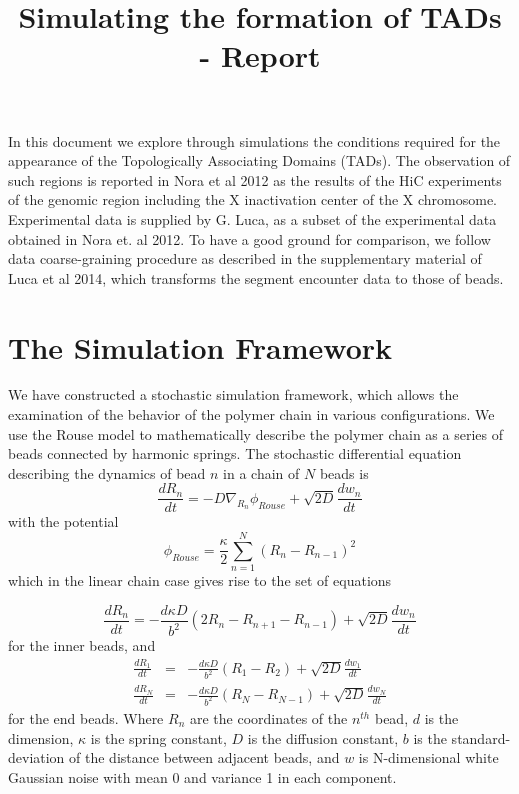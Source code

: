 \documentclass[12pt]{paper}
\begin{document}
\title{Simulating the formation of TADs - Report}
\maketitle
In this document we explore through simulations the conditions required for the appearance of the Topologically Associating Domains (TADs). The observation of such regions is reported in Nora et al 2012 as the results of the HiC experiments of the genomic region including the X inactivation center of the X chromosome. Experimental data is supplied by G. Luca, as a subset of the experimental data obtained in Nora et. al 2012. To have a good ground for comparison, we follow data coarse-graining procedure as described in the supplementary material of Luca et al 2014, which transforms the segment encounter data to those of beads.   

\section{The Simulation Framework}
We have constructed a stochastic simulation framework, which allows the examination of the behavior of the polymer chain in various configurations.
We use the Rouse model to mathematically describe the polymer chain as a series of beads connected by harmonic springs. The stochastic differential equation describing the dynamics of bead $n$ in a chain of $N$ beads is 
\begin{equation*}
\frac{dR_n}{dt} = -D\nabla_{R_n}\phi_{Rouse}+\sqrt{2D}\frac{dw_n}{dt}
\end{equation*}
with the potential 
\begin{equation*}
\phi_{Rouse}=\frac{\kappa}{2}\sum_{n=1}^N \left(R_n-R_{n-1}\right)^2
\end{equation*}
 which in the linear chain case gives rise to the set of equations

\begin{equation*}
\frac{dR_n}{dt}= -\frac{d\kappa D}{b^2}\left(2R_n-R_{n+1}-R_{n-1}\right)+\sqrt{2D}\frac{dw_n}{dt}
\end{equation*}
for the inner beads, and 
\begin{eqnarray*}
\frac{dR_1}{dt}&=& -\frac{d\kappa D}{b^2}\left(R_1-R_{2}\right)+\sqrt{2D}\frac{dw_1}{dt}\\
\frac{dR_N}{dt}&=& -\frac{d\kappa D}{b^2}\left(R_N-R_{N-1}\right)+\sqrt{2D}\frac{dw_N}{dt}
\end{eqnarray*} 
for the end beads. Where $R_n$ are the coordinates of the $n^{th}$ bead, $d$ is the dimension, $\kappa$ is the spring constant, $D$ is the diffusion constant, $b$ is the standard-deviation of the distance between adjacent beads, and $w$ is N-dimensional white Gaussian noise with mean 0 and variance 1 in each component. 
\end{document}

